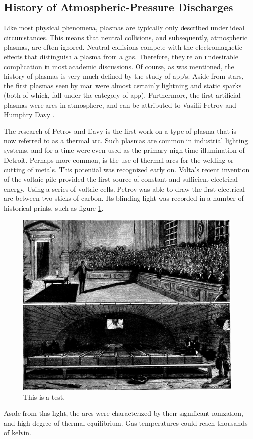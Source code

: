 \subsection{History of Atmospheric-Pressure Discharges}

Like most physical phenomena, plasmas are typically only described under ideal
circumstances. This means that neutral collisions, and subsequently, atmospheric
plasmas, are often ignored. Neutral collisions compete with the electromagnetic
effects that distinguish a plasma from a gas. Therefore, they're an undesirable
complication in most academic discussions. Of course, as was mentioned, the
history of plasmas is very much defined by the study of \acs{app}'s. Aside from
stars, the first plasmas seen by man were almost certainly lightning and static
sparks (both of which, fall under the category of \acs{app}). Furthermore, the
first artificial plasmas were arcs in atmosphere, and can be attributed to
Vasilii Petrov and Humphry Davy \cite{Anders2003}.

The research of Petrov and Davy is the first work on a type of plasma that is
now referred to as a thermal arc. Such plasmas are common in industrial lighting
systems, and for a time were even used as the primary nigh-time illumination of
Detroit. Perhaps more common, is the use of thermal arcs for the welding or
cutting of metals. This potential was recognized early on. Volta's recent
invention of the voltaic pile provided the first source of constant and
sufficient electrical energy. Using a series of voltaic cells, Petrov was able
to draw the first electrical arc between two sticks of carbon. Its blinding
light was recorded in a number of historical prints, such as figure
\ref{fig:humphry}.
\begin{figure}\label{fig:humphry}
  \centering
  \includegraphics[scale=0.25]{chapters/introduction/figures/humphry.jpg}
  \caption{This is a test.}
\end{figure}
Aside from this light, the arcs were characterized by their significant
ionization, and high degree of thermal equilibrium. Gas temperatures could reach
thousands of kelvin.

